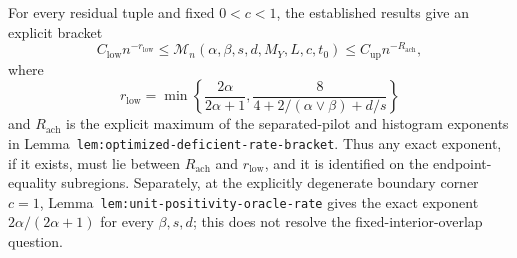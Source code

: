 For every residual tuple and fixed \(0<c<1\), the established results give an explicit bracket
\[
C_{\mathrm{low}}n^{-r_{\mathrm{low}}}
\le
\mathcal M_n(\alpha,\beta,s,d,M_Y,L,c,t_0)
\le
C_{\mathrm{up}}n^{-R_{\mathrm{ach}}},
\]
where
\[
r_{\mathrm{low}}=
\min\left\{
\frac{2\alpha}{2\alpha+1},
\frac{8}{4+2/(\alpha\vee\beta)+d/s}
\right\}
\]
and \(R_{\mathrm{ach}}\) is the explicit maximum of the separated-pilot and histogram exponents in Lemma~\texttt{lem:optimized-deficient-rate-bracket}. Thus any exact exponent, if it exists, must lie between \(R_{\mathrm{ach}}\) and \(r_{\mathrm{low}}\), and it is identified on the endpoint-equality subregions. Separately, at the explicitly degenerate boundary corner \(c=1\), Lemma~\texttt{lem:unit-positivity-oracle-rate} gives the exact exponent \(2\alpha/(2\alpha+1)\) for every \(\beta,s,d\); this does not resolve the fixed-interior-overlap question.